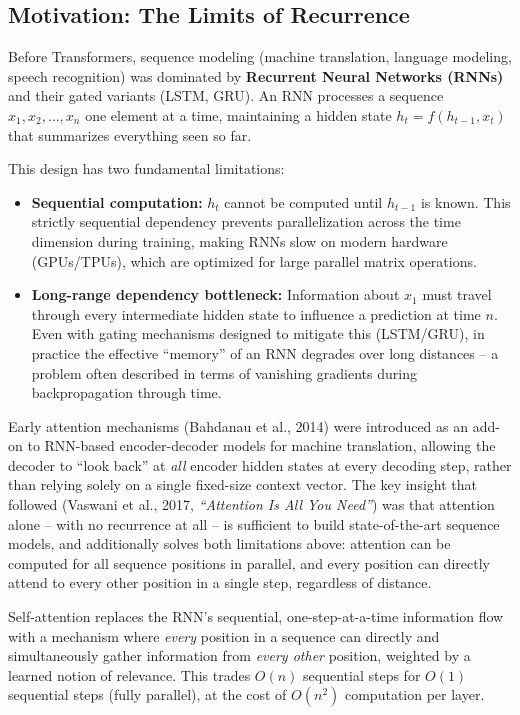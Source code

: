 \documentclass[11pt]{article}
\begin{document}
\subsection*{Motivation: The Limits of Recurrence}

Before Transformers, sequence modeling (machine translation, language modeling, speech recognition) was dominated by \textbf{Recurrent Neural Networks (RNNs)} and their gated variants (LSTM, GRU). An RNN processes a sequence $x_1, x_2, \ldots, x_n$ one element at a time, maintaining a hidden state $h_t = f(h_{t-1}, x_t)$ that summarizes everything seen so far.

This design has two fundamental limitations:

\begin{itemize}[leftmargin=1.5em]
    \item \textbf{Sequential computation:} $h_t$ cannot be computed until $h_{t-1}$ is known. This strictly sequential dependency prevents parallelization across the time dimension during training, making RNNs slow on modern hardware (GPUs/TPUs), which are optimized for large parallel matrix operations.
    \item \textbf{Long-range dependency bottleneck:} Information about $x_1$ must travel through every intermediate hidden state to influence a prediction at time $n$. Even with gating mechanisms designed to mitigate this (LSTM/GRU), in practice the effective ``memory'' of an RNN degrades over long distances -- a problem often described in terms of vanishing gradients during backpropagation through time.
\end{itemize}

Early attention mechanisms (Bahdanau et al., 2014) were introduced as an add-on to RNN-based encoder-decoder models for machine translation, allowing the decoder to ``look back'' at \emph{all} encoder hidden states at every decoding step, rather than relying solely on a single fixed-size context vector. The key insight that followed (Vaswani et al., 2017, \emph{``Attention Is All You Need''}) was that attention alone -- with no recurrence at all -- is sufficient to build state-of-the-art sequence models, and additionally solves both limitations above: attention can be computed for all sequence positions in parallel, and every position can directly attend to every other position in a single step, regardless of distance.

\begin{keyidea}
Self-attention replaces the RNN's sequential, one-step-at-a-time information flow with a mechanism where \emph{every} position in a sequence can directly and simultaneously gather information from \emph{every other} position, weighted by a learned notion of relevance. This trades $O(n)$ sequential steps for $O(1)$ sequential steps (fully parallel), at the cost of $O(n^2)$ computation per layer.
\end{keyidea}
\end{document}
